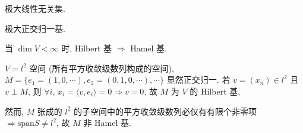 \documentclass{note}
\begin{document}
\begin{df}[Hamel 基]
    极大线性无关集.
\end{df}

\begin{df}[Hilbert 基]
    极大正交归一基.
\end{df}

\begin{thm}
    当 $\dim V<\infty$ 时, Hilbert 基 $\Longrightarrow$ Hamel 基.
\end{thm}

\begin{eg}
    $V=l^2$ 空间 (所有平方收敛级数列构成的空间), $M=\{e_1=(1,0,\cdots),e_2=(0,1,0,\cdots),\cdots\}$ 显然正交归一. 若 $v=(x_n)\in l^2$ 且 $v\perp M$, 则 $\forall i$, $x_i=\langle v,e_i\rangle=0\Longrightarrow v=0$, 故 $M$ 为 $V$ 的 Hilbert 基, 

    然而, $M$ 张成的 $l^2$ 的子空间中的平方收敛级数列必仅有有限个非零项 $\Longrightarrow\text{span}S\neq l^2$, 故 $M$ 非 Hamel 基.
\end{eg}
\end{document}
